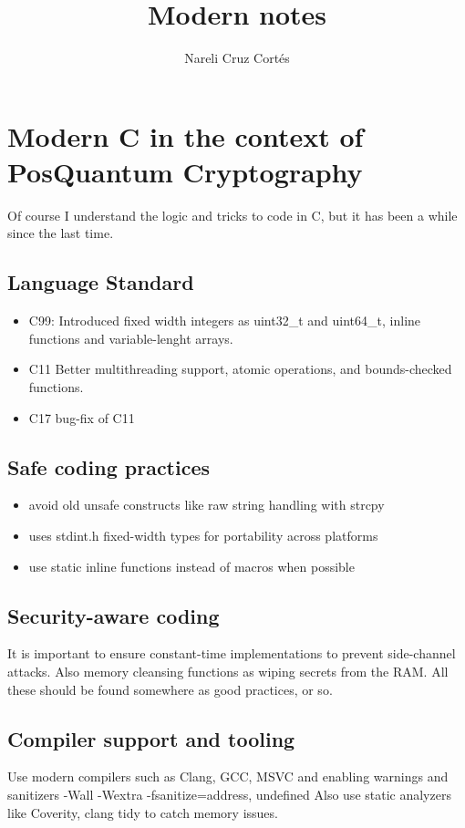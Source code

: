 \documentclass{article}
\title{Modern notes}
\author{Nareli Cruz Cort\'es}
\begin{document}
\maketitle

\section{Modern C in the context of PosQuantum Cryptography}

Of course I understand the logic and tricks to code in C, but it has been a while since the last time. 
\subsection{Language Standard}
\begin{itemize}
\item C99: Introduced fixed width integers as uint32\_t and uint64\_t, inline functions and variable-lenght arrays.
\item C11 Better multithreading support, atomic operations, and bounds-checked functions.
\item C17 bug-fix of C11
\end{itemize} 
\subsection{Safe coding practices}

\begin{itemize}
    \item avoid old unsafe constructs like raw string handling with strcpy
    \item uses stdint.h fixed-width types for portability across platforms
    \item use static inline functions instead of macros when possible
\end{itemize}
\subsection{Security-aware coding}
It is important to ensure constant-time implementations to prevent side-channel attacks. Also memory cleansing functions as wiping secrets from the RAM. All these should be found somewhere as good practices, or so.
\subsection{Compiler support and tooling}
Use modern compilers such as Clang, GCC, MSVC and enabling warnings and sanitizers -Wall -Wextra -fsanitize=address, undefined
Also use static analyzers like Coverity, clang tidy to catch memory issues.
\end{document}
